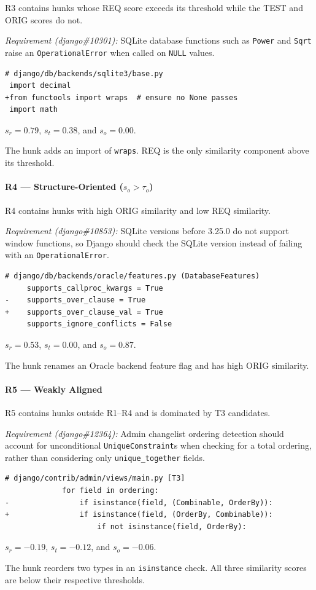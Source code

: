 R3 contains hunks whose REQ score exceeds its threshold while the TEST and ORIG scores do not.

\smallskip
\noindent\textit{Requirement (django\#10301):}
SQLite database functions such as \texttt{Power} and \texttt{Sqrt} raise an \texttt{OperationalError} when called on \texttt{NULL} values.

\begin{lstlisting}
# django/db/backends/sqlite3/base.py
 import decimal
+from functools import wraps  # ensure no None passes
 import math
\end{lstlisting}

\noindent
$s_r=0.79$, $s_t=0.38$, and $s_o=0.00$.

The hunk adds an import of \texttt{wraps}. REQ is the only similarity component above its threshold.

\paragraph{R4 --- Structure-Oriented \textnormal{($s_o>\tau_o$)}}

R4 contains hunks with high ORIG similarity and low REQ similarity.

\smallskip
\noindent\textit{Requirement (django\#10853):}
SQLite versions before 3.25.0 do not support window functions, so Django should check the SQLite version instead of failing with an \texttt{OperationalError}.

\begin{lstlisting}
# django/db/backends/oracle/features.py (DatabaseFeatures)
     supports_callproc_kwargs = True
-    supports_over_clause = True
+    supports_over_clause_val = True
     supports_ignore_conflicts = False
\end{lstlisting}

\noindent
$s_r=0.53$, $s_t=0.00$, and $s_o=0.87$.

The hunk renames an Oracle backend feature flag and has high ORIG similarity.

\paragraph{R5 --- Weakly Aligned}

R5 contains hunks outside R1--R4 and is dominated by T3 candidates.

\smallskip
\noindent\textit{Requirement (django\#12364):}
Admin changelist ordering detection should account for unconditional \texttt{UniqueConstraint}s when checking for a total ordering, rather than considering only \texttt{unique\_together} fields.

\begin{lstlisting}
# django/contrib/admin/views/main.py [T3]
             for field in ordering:
-                if isinstance(field, (Combinable, OrderBy)):
+                if isinstance(field, (OrderBy, Combinable)):
                     if not isinstance(field, OrderBy):
\end{lstlisting}

\noindent
$s_r=-0.19$, $s_t=-0.12$, and $s_o=-0.06$.

The hunk reorders two types in an \texttt{isinstance} check. All three similarity scores are below their respective thresholds.
